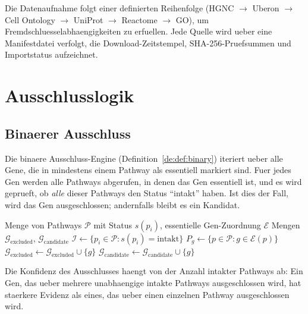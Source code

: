\documentclass[12pt,a4paper]{article}
\begin{document}
Die Datenaufnahme folgt einer definierten Reihenfolge (HGNC $\to$ Uberon $\to$ Cell Ontology $\to$ UniProt $\to$ Reactome $\to$ GO), um Fremdschluesselabhaengigkeiten zu erfuellen. Jede Quelle wird ueber eine Manifestdatei verfolgt, die Download-Zeitstempel, SHA-256-Pruefsummen und Importstatus aufzeichnet.

\section*{Ausschlusslogik}
\label{de:sec:exclusion}

\subsection*{Binaerer Ausschluss}

Die binaere Ausschluss-Engine (Definition~\ref{de:def:binary}) iteriert ueber alle Gene, die in mindestens einem Pathway als essentiell markiert sind. Fuer jedes Gen werden alle Pathways abgerufen, in denen das Gen essentiell ist, und es wird geprueft, ob \emph{alle} dieser Pathways den Status "`intakt"' haben. Ist dies der Fall, wird das Gen ausgeschlossen; andernfalls bleibt es ein Kandidat.

\begin{algorithm}[H]
\caption{Binaere Ausschlussanalyse}
\label{de:alg:binary}
\begin{algorithmic}[1]
\Require Menge von Pathways $\mathcal{P}$ mit Status $s(p_i)$, essentielle Gen-Zuordnung $\mathcal{E}$
\Ensure Mengen $\mathcal{G}_{\text{excluded}}$, $\mathcal{G}_{\text{candidate}}$
\State $\mathcal{I} \gets \{p_i \in \mathcal{P} : s(p_i) = \text{intakt}\}$
 
    \State $P_g \gets \{p \in \mathcal{P} : g \in \mathcal{E}(p)\}$ 
        \State $\mathcal{G}_{\text{excluded}} \gets \mathcal{G}_{\text{excluded}} \cup \{g\}$
    \Else
        \State $\mathcal{G}_{\text{candidate}} \gets \mathcal{G}_{\text{candidate}} \cup \{g\}$
    \EndIf
\EndFor
\end{algorithmic}
\end{algorithm}

Die Konfidenz des Ausschlusses haengt von der Anzahl intakter Pathways ab: Ein Gen, das ueber mehrere unabhaengige intakte Pathways ausgeschlossen wird, hat staerkere Evidenz als eines, das ueber einen einzelnen Pathway ausgeschlossen wird.
\end{document}
